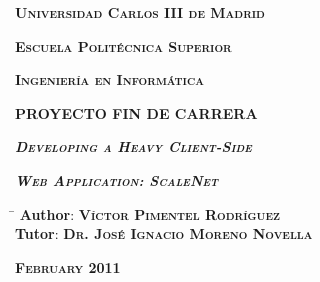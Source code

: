 \begin{titlepage}

  \addtolength{\oddsidemargin}{0.8cm}

  \centerline{\large{\textbf{\textsc{Universidad Carlos III de Madrid}}}}
  \vspace{0.8cm}

  \centerline{\large{\textbf{\textsc{Escuela Politécnica Superior}}}}
  \vspace{0.8cm}

  \centerline{\large{\textbf{\textsc{Ingeniería en Informática}}}}

  \begin{figure}[here]
  \end{figure}

  \centerline{\Large{\textbf{\uppercase{PROYECTO FIN DE CARRERA}}}}
  \vspace{2cm}

  \centerline{\huge{\textbf{\textit{\textsc{Developing a Heavy
  Client-Side}}}}}
  \vspace{0.4cm}

  \centerline{\huge{\textbf{\textit{\textsc{Web Application: ScaleNet}}}}}
  \vspace{3.5cm}

  \begin{flushright}
      \begin{tabbing}\hspace{2.5cm} \= \kill
        {\large{\textbf{Author}:}} \> {\large{\textbf{\textsc{Víctor Pimentel
        Rodríguez}}}}\\
        {\large{\textbf{Tutor}:}} \> {\large{\textbf{\textsc{Dr. José Ignacio
        Moreno Novella}}}}\\
      \end{tabbing}
  \end{flushright}

  \begin{flushright}
    {\large{\textbf{\textsc{February 2011}}}}
  \end{flushright}

\end{titlepage}